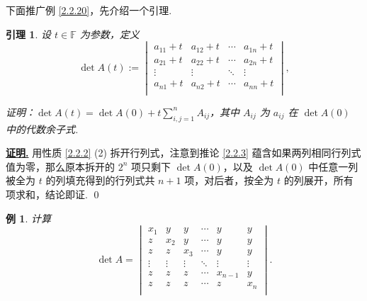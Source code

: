 \documentclass[10pt,openany]{article}
\theoremstyle{thmstyle} %
\theoremstyle{defstyle} %
\newtheorem{lemma}[theorem]{引理}
\theoremstyle{prostyle} %
\theoremstyle{exastyle}
\newtheorem{example}[theorem]{例}
\theoremstyle{remstyle}
\renewenvironment{proof}[1][证明]{\par\underline{\textbf{#1.}} \;\fangsong}{\qed\par}
\newcommand{\F}{\mathbb{F}}
\begin{document}
下面推广例 \ref{2.2.20}，先介绍一个引理.

\begin{lemma}
    设 \( t \in \F \) 为参数，定义
    \[ \det A(t):= \begin{vmatrix}
    	a_{11} + t & a_{12} + t & \cdots & a_{1n} + t \\
    	a_{21} + t & a_{22} + t & \cdots & a_{2n} + t \\
    	\vdots & \vdots & \ddots & \vdots \\
    	a_{n1} + t & a_{n2} + t & \cdots & a_{nn} + t \\
    \end{vmatrix}, \]
    
    证明：\( \det A(t) = \det A(0) + t \sum_{i,j=1}^{n} A_{ij} \)，其中 \( A_{ij} \) 为 \( a_{ij} \) 在 \( \det A(0) \) 中的代数余子式.
    \label{2.2.21}
\end{lemma}

\begin{proof}
	用性质 \ref{2.2.2} (2) 拆开行列式，注意到推论 \ref{2.2.3} 蕴含如果两列相同行列式值为零，那么原本拆开的 \( 2^n \) 项只剩下 \( \det A(0) \)，以及 \( \det A(0) \) 中任意一列被全为 \( t \) 的列填充得到的行列式共 \( n+1 \) 项，对后者，按全为 \( t \) 的列展开，所有项求和，结论即证.
\end{proof}

\begin{example}
	计算 
	\[
	\det A= 
	\begin{vmatrix}
		x_1 & y & y & \cdots & y & y \\
		z & x_2 & y & \cdots & y & y \\
		z & z & x_3 & \cdots & y & y \\
		\vdots & \vdots & \vdots & \ddots & \vdots & \vdots \\
		z & z & z & \cdots & x_{n-1} & y \\
		z & z & z & \cdots & z & x_n \\
	\end{vmatrix}.
	\]
	
\end{example}
\end{document}
